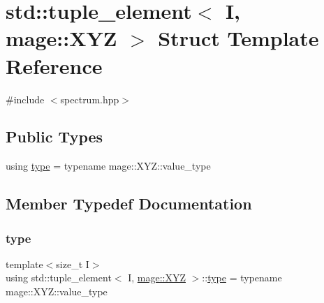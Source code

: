 \hypertarget{structstd_1_1tuple__element_3_01_i_00_01mage_1_1_x_y_z_01_4}{}\section{std\+:\+:tuple\+\_\+element$<$ I, mage\+:\+:X\+YZ $>$ Struct Template Reference}
\label{structstd_1_1tuple__element_3_01_i_00_01mage_1_1_x_y_z_01_4}


{\ttfamily \#include $<$spectrum.\+hpp$>$}

\subsection*{Public Types}
\begin{DoxyCompactItemize}
\item 
using \mbox{\hyperlink{structstd_1_1tuple__element_3_01_i_00_01mage_1_1_x_y_z_01_4_ab340458d10d806cc004b738bc1b587d3}{type}} = typename mage\+::\+X\+Y\+Z\+::value\+\_\+type
\end{DoxyCompactItemize}


\subsection{Member Typedef Documentation}
\mbox{\label{structstd_1_1tuple__element_3_01_i_00_01mage_1_1_x_y_z_01_4_ab340458d10d806cc004b738bc1b587d3}} 
\subsubsection{\texorpdfstring{type}{type}}
{\footnotesize\ttfamily template$<$size\+\_\+t I$>$ \\
using std\+::tuple\+\_\+element$<$ I, \mbox{\hyperlink{structmage_1_1_x_y_z}{mage\+::\+X\+YZ}} $>$\+::\mbox{\hyperlink{structstd_1_1tuple__element_3_01_i_00_01mage_1_1_x_y_z_01_4_ab340458d10d806cc004b738bc1b587d3}{type}} =  typename mage\+::\+X\+Y\+Z\+::value\+\_\+type}

